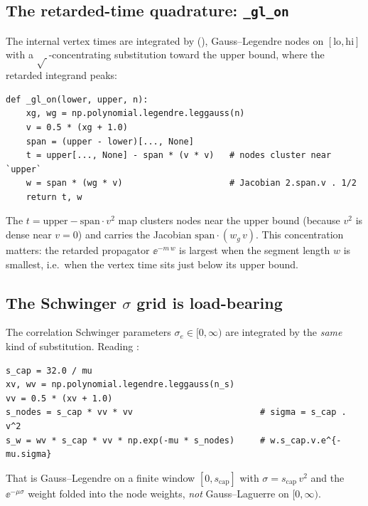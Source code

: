 \subsection{The retarded-time quadrature: \texorpdfstring{\texttt{\_gl\_on}}{\_gl\_on}}

The internal vertex times are integrated by 
(), Gauss--Legendre nodes on $[\text{lo},\text{hi}]$
with a $\sqrt{\,}$-concentrating substitution toward the upper bound, where the
retarded integrand peaks:

\begin{lstlisting}
def _gl_on(lower, upper, n):
    xg, wg = np.polynomial.legendre.leggauss(n)
    v = 0.5 * (xg + 1.0)
    span = (upper - lower)[..., None]
    t = upper[..., None] - span * (v * v)   # nodes cluster near `upper`
    w = span * (wg * v)                     # Jacobian 2.span.v . 1/2
    return t, w
\end{lstlisting}

The $t = \text{upper} - \text{span}\cdot v^2$ map clusters nodes near the upper
bound (because $v^2$ is dense near $v=0$) and carries the Jacobian
$\text{span}\cdot(w_g\,v)$. This concentration matters: the retarded propagator
$\ee^{-m\,w}$ is largest when the segment length $w$ is smallest, i.e.\ when the
vertex time sits just below its upper bound.

\subsection{The Schwinger \texorpdfstring{$\sigma$}{sigma} grid is load-bearing}

The correlation Schwinger parameters $\sigma_e\in[0,\infty)$ are integrated by the
\emph{same} kind of substitution. Reading
:

\begin{lstlisting}
s_cap = 32.0 / mu
xv, wv = np.polynomial.legendre.leggauss(n_s)
vv = 0.5 * (xv + 1.0)
s_nodes = s_cap * vv * vv                         # sigma = s_cap . v^2
s_w = wv * s_cap * vv * np.exp(-mu * s_nodes)     # w.s_cap.v.e^{-mu.sigma}
\end{lstlisting}

That is Gauss--Legendre on a finite window $[0,s_{\text{cap}}]$ with
$\sigma = s_{\text{cap}}\,v^2$ and the $\ee^{-\mu\sigma}$ weight folded into the
node weights, \emph{not} Gauss--Laguerre on $[0,\infty)$.

